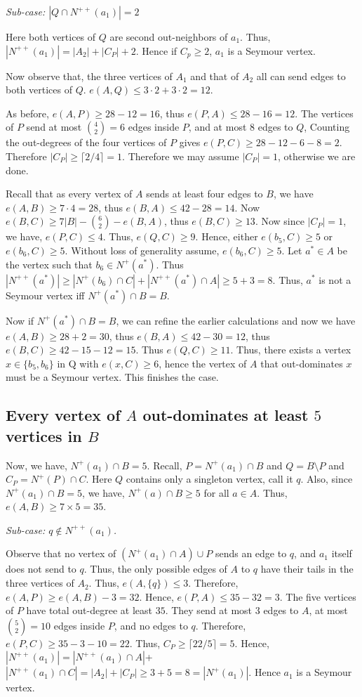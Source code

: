 \documentclass[a4paper,fleqn]{cas-sc}
\theoremstyle{definition}
\begin{document}
\medskip
 \emph{Sub-case: $|Q\cap N^{++}(a_1)|=2$}

Here both vertices of $Q$ are second out-neighbors of $a_1$. Thus, $|N^{++}(a_1)|=|A_2|+|C_P|+2$. Hence if $C_p\geq 2$, $a_1$ is a Seymour vertex.

Now observe that, the three vertices of $A_1$ and that of $A_2$ all can send edges to both vertices of $Q$. $e(A,Q)\le 3\cdot 2+3\cdot 2=12$.

As before, $e(A,P)\ge 28-12=16$, thus $e(P,A)\le 28-16=12$. The vertices of $P$ send at most $\binom{4}{2}=6$ edges inside $P$, and at most $8$ edges to $Q$, Counting the out-degrees of the four vertices of $P$ gives $e(P,C)\ge 28-12-6-8=2$. Therefore $|C_P|\ge \lceil 2/4\rceil=1$. Therefore we may assume $|C_P|=1$, otherwise we are done.

Recall that as every vertex of $A$ sends at least four edges to $B$, we have $e(A,B)\ge 7\cdot 4=28$, thus $e(B,A)\leq 42-28=14$. Now $e(B,C)\geq 7|B|-\binom{6}{2}-e(B,A)$, thus $e(B,C)\geq 13$. Now since $|C_P|=1$, we have, $e(P,C)\leq 4$. Thus, $e(Q,C)\geq 9$. Hence, either $e(b_5,C)\geq 5$ or $e(b_6,C)\geq 5$. Without loss of generality assume, $e(b_6,C)\geq 5$. Let $a^*\in A$ be the vertex such that $b_6\in N^+(a^*)$. Thus $|N^{++}(a^*)|\geq |N^+(b_6)\cap C|+|N^{++}(a^*)\cap A|\geq 5+3=8$. Thus, $a^*$ is not a Seymour vertex iff $N^+(a^*)\cap B=B$.

Now if $N^+(a^*)\cap B=B$, we can refine the earlier calculations and now we have $e(A,B)\geq 28+2=30$, thus $e(B,A)\leq 42-30=12$, thus $e(B,C)\geq 42-15-12=15$. Thus $e(Q,C)\geq 11$. Thus, there exists a vertex $x\in \{b_5, b_6\}$ in Q with $e(x,C)\geq 6$, hence the vertex of $A$ that out-dominates $x$ must be a Seymour vertex. This finishes the case.



\subsection*{Every vertex of $A$ out-dominates at least $5$ vertices in $B$}
Now, we have, $N^+(a_1)\cap B=5$. Recall, $P= N^+(a_1)\cap B$ and $Q=B\setminus P$ and $C_P=N^+(P)\cap C$. Here $Q$ contains only a singleton vertex, call it $q$. Also, since $N^+(a_1)\cap B=5$, we have, $N^+(a)\cap B\geq 5$ for all $a\in A$. Thus, $e(A,B)\geq 7\times 5=35$.



\medskip
\emph{Sub-case: $q\notin N^{++}(a_1)$.}

Observe that no vertex of $(N^+(a_1)\cap A)\cup P$ sends an edge to $q$, and $a_1$ itself does not send to $q$. Thus, the only possible edges of $A$ to $q$ have their tails in the three vertices of $A_2$. Thus, $e(A,\{q\})\le 3$. 
Therefore, $e(A,P)\ge e(A,B)-3=32$. Hence, $e(P,A)\le 35-32=3$. The five vertices of $P$ have total out-degree at least $35$. They send at most $3$ edges to $A$, at most $\binom{5}{2}=10$ edges inside $P$, and no edges to $q$. Therefore, $e(P,C)\ge 35-3-10=22$. Thus, $C_P \geq \lceil 22/5\rceil=5$. Hence, $|N^{++}(a_1)|=|N^{++}(a_1)\cap A|$+$|N^{++}(a_1)\cap C|=|A_2|+|C_P|\geq 3+5=8=|N^+(a_1)|$. Hence $a_1$ is a Seymour vertex.
\end{document}
